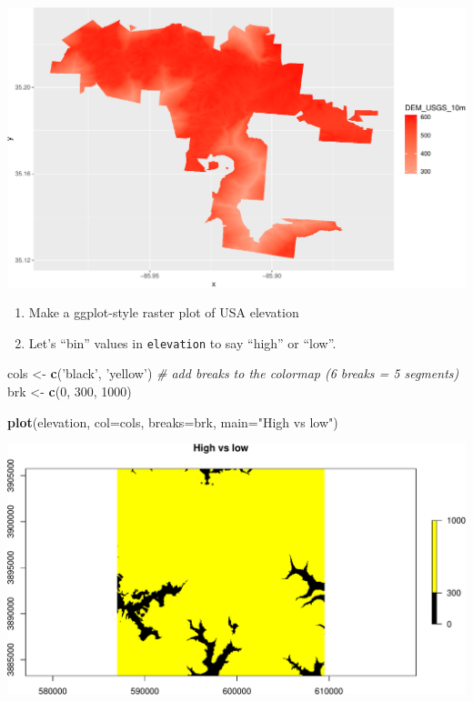 \documentclass[
]{book}
\newenvironment{Shaded}{\begin{snugshade}}{\end{snugshade}}
\newcommand{\CommentTok}[1]{\textcolor[rgb]{0.56,0.35,0.01}{\textit{#1}}}
\newcommand{\DataTypeTok}[1]{\textcolor[rgb]{0.13,0.29,0.53}{#1}}
\newcommand{\DecValTok}[1]{\textcolor[rgb]{0.00,0.00,0.81}{#1}}
\newcommand{\KeywordTok}[1]{\textcolor[rgb]{0.13,0.29,0.53}{\textbf{#1}}}
\newcommand{\NormalTok}[1]{#1}
\newcommand{\StringTok}[1]{\textcolor[rgb]{0.31,0.60,0.02}{#1}}
\begin{document}
\includegraphics{figures/unnamed-chunk-576-1.pdf}

\begin{enumerate}
\def\labelenumi{\arabic{enumi}.}
\setcounter{enumi}{31}
\item
  Make a ggplot-style raster plot of USA elevation
\item
  Let's ``bin'' values in \texttt{elevation} to say ``high'' or ``low''.
\end{enumerate}

\begin{Shaded}
\begin{Highlighting}[]
\NormalTok{cols <-}\StringTok{ }\KeywordTok{c}\NormalTok{(}\StringTok{'black'}\NormalTok{, }\StringTok{'yellow'}\NormalTok{)}
\CommentTok{# add breaks to the colormap (6 breaks = 5 segments)}
\NormalTok{brk <-}\StringTok{ }\KeywordTok{c}\NormalTok{(}\DecValTok{0}\NormalTok{, }\DecValTok{300}\NormalTok{, }\DecValTok{1000}\NormalTok{)}

\KeywordTok{plot}\NormalTok{(elevation, }\DataTypeTok{col=}\NormalTok{cols, }\DataTypeTok{breaks=}\NormalTok{brk, }\DataTypeTok{main=}\StringTok{"High vs low"}\NormalTok{)}
\end{Highlighting}
\end{Shaded}

\includegraphics{figures/unnamed-chunk-577-1.pdf}
\end{document}
